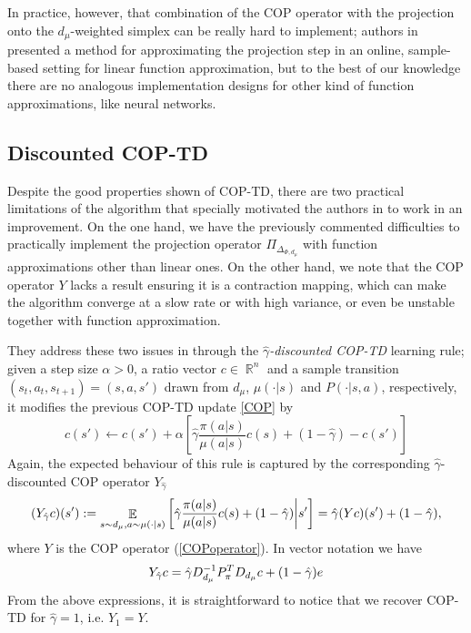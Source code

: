 \documentclass[12pt,a4paper,openright,twoside]{article}
\DeclareMathOperator*{\E}{\mathbb{E}}
\DeclareMathOperator*{\R}{\mathbb{R}}
\numberwithin{equation}{section}
\theoremstyle{definition}
\theoremstyle{remark}
\theoremstyle{plain}
\begin{document}
In practice, however, that combination of the COP operator with the projection onto the $d_\mu$-weighted simplex can be really hard to implement; authors in \cite{COPTD} presented a method for approximating the projection step in an online, sample-based setting for linear function approximation, but to the best of our knowledge there are no analogous implementation designs for other kind of function approximations, like neural networks.





\subsection{Discounted COP-TD}

Despite the good properties shown of COP-TD, there are two practical limitations of the algorithm that specially motivated the authors in \cite{DCOPTD} to work in an improvement. On the one hand, we have the previously commented difficulties to practically implement the projection operator $\Pi_{\Delta_{\Phi,d_\mu}}$ with function approximations other than linear ones. On the other hand, we note that the COP operator $Y$ lacks a result ensuring it is a contraction mapping, which can make the algorithm converge at a slow rate or with high variance, or even be unstable together with function approximation.

They address these two issues in \cite{DCOPTD} through the $\hat{\gamma}$\textit{-discounted COP-TD} learning rule; given a step size $\alpha > 0$, a ratio vector $c \in \R^n$ and a sample transition $(s_t,a_t,s_{t+1}) = (s,a,s')$ drawn from $d_\mu$, $\mu(\cdot|s)$ and $P(\cdot|s,a)$, respectively, it modifies the previous COP-TD update \ref{COP} by
\begin{equation} \label{DCOP}
    c(s') \leftarrow c(s') + \alpha \left[\hat{\gamma} \frac{\pi(a|s)}{\mu(a|s)}c(s) + (1-\hat{\gamma}) - c(s') \right]
\end{equation}
Again, the expected behaviour of this rule is captured by the corresponding $\hat{\gamma}$-discounted COP operator $Y_{\hat{\gamma}}$
\begin{equation} \label{DCOPoperator}
    (Y_{\Hat{\gamma}}c)(s') := \E_{s \sim d_\mu, a \sim \mu(\cdot|s)} \left[ \hat{\gamma} \frac{\pi(a|s)}{\mu(a|s)}c(s) + (1-\hat{\gamma}) \bigg| s' \right] = \hat{\gamma} (Yc)(s') + (1-\hat{\gamma}),
\end{equation}
where $Y$ is the COP operator (\ref{COPoperator}). In vector notation we have
\begin{equation}
    Y_{\Hat{\gamma}}c = \Hat{\gamma} D_{d_\mu}^{-1}P_\pi^T D_{d_\mu} c + (1-\Hat{\gamma})e
\end{equation}
From the above expressions, it is straightforward to notice that we recover COP-TD for $\hat{\gamma} = 1$, i.e. $Y_1=Y$.
\end{document}
